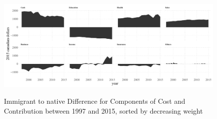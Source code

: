       \begin{figure}[H]%
        \caption{Immigrant to native Difference for Components of Cost and Contribution between 1997 and 2015, sorted by decreasing weight}
        \includegraphics[width=1\textwidth]{./res/wgtComp.pdf}%
        \label{fig:wgtComp}%
    \end{figure}%
